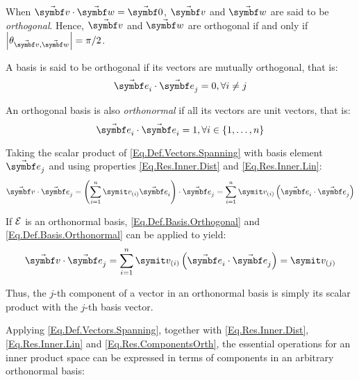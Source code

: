 When $\vabs{v}\cdot\vabs{w}=\vabs{0}$, $\vabs{v}$ and $\vabs{w}$ are said to be \emph{orthogonal}. Hence, $\vabs{v}$ and $\vabs{w}$ are orthogonal if and only if $\left|\theta_{\vabs{v},  \vabs{w}}\right|=\pi/2$.

A basis is said to be orthogonal if its vectors are mutually orthogonal, that is:
\begin{equation} \label{Eq.Def.Basis.Orthogonal}
\vasub{\bv}{i} \cdot \vasub{\bv}{j} = 0, \forall i \neq j
\end{equation}

An orthogonal basis is also \emph{orthonormal} if all its vectors are unit vectors, that is:
\begin{equation} \label{Eq.Def.Basis.Orthonormal}
\vasub{\bv}{i} \cdot \vasub{\bv}{i} = 1, \forall i \in \{1,\dots,n\}
\end{equation}

Taking the scalar product of \eqref{Eq.Def.Vectors.Spanning} with basis element $\vasub{\bv}{j}$ and using properties \eqref{Eq.Res.Inner.Dist} and \eqref{Eq.Res.Inner.Lin}:
\begin{equation*}
	\vabs{v}\cdot\vasub{\bv}{j}= \rndp{\sum_{i=1}^{n}\cmp{v}{i}\vasub{\bv}{i}} \cdot \vasub{\bv}{j} = \sum_{i=1}^{n}\cmp{v}{i}\rndp{\vasub{\bv}{i} \cdot \vasub{\bv}{j}}
\end{equation*}

If $\mathcal{E}_{ }$ is an orthonormal basis, \eqref{Eq.Def.Basis.Orthogonal} and \eqref{Eq.Def.Basis.Orthonormal} can be applied to yield:
\begin{equation} \label{Eq.Res.ComponentsOrth}
\vabs{v}\cdot\vasub{\bv}{j} = \sum_{i=1}^{n}\cmp{v}{i}\rndp{\vasub{\bv}{i} \cdot \vasub{\bv}{j}} = \cmp{v}{j}
\end{equation}

Thus, the $j$-th component of a vector in an orthonormal basis is simply its scalar product with the $j$-th basis vector.

Applying \eqref{Eq.Def.Vectors.Spanning}, together with \eqref{Eq.Res.Inner.Dist}, \eqref{Eq.Res.Inner.Lin} and \eqref{Eq.Res.ComponentsOrth}, the essential operations for an inner product space can be expressed in terms of components in an arbitrary orthonormal basis:

